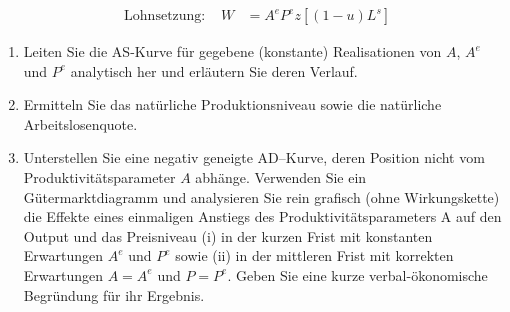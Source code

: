 \documentclass{scrartcl}
\begin{document}
\begin{enumerate}
\begin{align}
  &\text{Lohnsetzung: }& W &=A^e P^e z[(1-u)L^s]
\end{align}
\begin{enumerate}
\item Leiten Sie die AS-Kurve f\"{u}r gegebene (konstante) Realisationen von $A$, $A^e$ und $P^e$ analytisch her und erl\"{a}utern Sie deren Verlauf.
\item Ermitteln Sie das nat\"{u}rliche Produktionsniveau sowie die nat\"{u}rliche Arbeitslosenquote.
\item Unterstellen Sie eine negativ geneigte AD–Kurve, deren Position nicht vom Produktivit\"{a}tsparameter $A$ abh\"{a}nge. Verwenden Sie ein G\"{u}termarktdiagramm und analysieren Sie rein grafisch (ohne Wirkungskette) die Effekte eines einmaligen Anstiegs des Produktivit\"{a}tsparameters A auf den Output und das Preisniveau (i) in der kurzen Frist mit konstanten Erwartungen $A^e$ und $P^e$ sowie (ii) in der mittleren Frist mit korrekten Erwartungen $A = A^e$ und $P = P^e$. Geben Sie eine kurze verbal-\"{o}konomische Begr\"{u}ndung f\"{u}r ihr Ergebnis.
\end{enumerate}
\end{enumerate}
\end{document}
